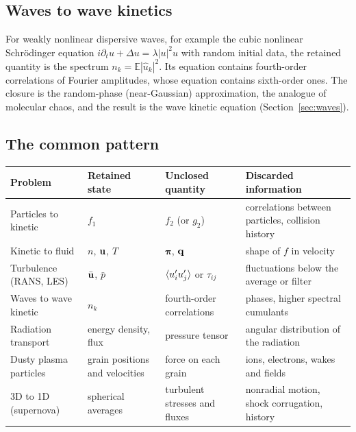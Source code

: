 \subsection{Waves to wave kinetics}

For weakly nonlinear dispersive waves, for example the cubic nonlinear
Schr\"odinger equation
$i\partial_tu+\Delta u=\lambda|u|^2u$ with random initial data, the retained
quantity is the spectrum $n_k=\mathbb E|\hat u_k|^2$. Its equation contains
fourth-order correlations of Fourier amplitudes, whose equation contains
sixth-order ones. The closure is the random-phase (near-Gaussian)
approximation, the analogue of molecular chaos, and the result is the wave
kinetic equation (Section~\ref{sec:waves}).

\subsection{The common pattern}

\begin{center}
\renewcommand{\arraystretch}{1.3}
\begin{tabularx}{\textwidth}{@{}P{3.0cm}P{2.7cm}P{2.9cm}Y@{}}
\toprule
Problem & Retained state & Unclosed quantity & Discarded information \\
\midrule
Particles to kinetic & $f_1$ & $f_2$ (or $g_2$)
  & correlations between particles, collision history \\
Kinetic to fluid & $n$, $\mathbf{u}$, $T$ & $\boldsymbol\pi$, $\mathbf{q}$
  & shape of $f$ in velocity \\
Turbulence (RANS, LES) & $\bar{\mathbf{u}}$, $\bar p$
  & $\langle u_i'u_j' \rangle$ or $\tau_{ij}$
  & fluctuations below the average or filter \\
Waves to wave kinetic & $n_k$ & fourth-order correlations
  & phases, higher spectral cumulants \\
Radiation transport & energy density, flux & pressure tensor
  & angular distribution of the radiation \\
Dusty plasma particles & grain positions and velocities
  & force on each grain
  & ions, electrons, wakes and fields \\
3D to 1D (supernova) & spherical averages
  & turbulent stresses and fluxes
  & nonradial motion, shock corrugation, history \\
\bottomrule
\end{tabularx}
\end{center}
